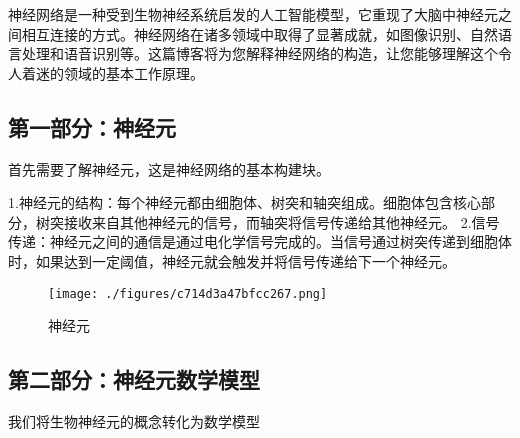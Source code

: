 神经网络是一种受到生物神经系统启发的人工智能模型，它重现了大脑中神经元之间相互连接的方式。神经网络在诸多领域中取得了显著成就，如图像识别、自然语言处理和语音识别等。这篇博客将为您解释神经网络的构造，让您能够理解这个令人着迷的领域的基本工作原理。
\subsection{第一部分：神经元 }
首先需要了解神经元，这是神经网络的基本构建块。

1.神经元的结构：每个神经元都由细胞体、树突和轴突组成。细胞体包含核心部分，树突接收来自其他神经元的信号，而轴突将信号传递给其他神经元。
2.信号传递：神经元之间的通信是通过电化学信号完成的。当信号通过树突传递到细胞体时，如果达到一定阈值，神经元就会触发并将信号传递给下一个神经元。
\begin{figure}[ht]
\centering
\texttt{[image: ./figures/c714d3a47bfcc267.png]}
\caption{神经元} \label{fig_CNN1_1}
\end{figure}

\subsection{第二部分：神经元数学模型 }
我们将生物神经元的概念转化为数学模型
